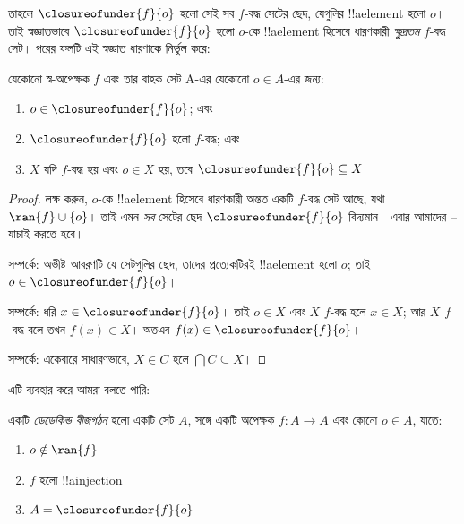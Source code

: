 \documentclass[../../../include/open-logic-section]{subfiles}
\begin{document}
তাহলে $\closureofunder{f}{o}$ হলো সেই সব $f$-বদ্ধ সেটের ছেদ, যেগুলির !!a{element} হলো $o$। তাই স্বজ্ঞাতভাবে $\closureofunder{f}{o}$ হলো $o$-কে !!a{element} হিসেবে ধারণকারী \emph{ক্ষুদ্রতম} $f$-বদ্ধ সেট। পরের ফলটি এই স্বজ্ঞাত ধারণাকে নির্ভুল করে:
\begin{lem}
	যেকোনো স্ব-অপেক্ষক $f$ এবং তার বাহক সেট A-এর যেকোনো $o \in A$-এর জন্য: 
	\begin{enumerate}
		\item{} $o \in \closureofunder{f}{o}$; এবং
		\item{} $\closureofunder{f}{o}$ হলো $f$-বদ্ধ; এবং
		\item{} $X$ যদি $f$-বদ্ধ হয় এবং $o \in
		X$ হয়, তবে $\closureofunder{f}{o} \subseteq X$
	\end{enumerate}
\end{lem}

\begin{proof}
লক্ষ করুন, $o$-কে !!a{element} হিসেবে ধারণকারী অন্তত একটি $f$-বদ্ধ সেট আছে, যথা $\ran{f}\cup
\{o\}$। তাই এমন \emph{সব} সেটের ছেদ $\closureofunder{f}{o}$ বিদ্যমান। এবার আমাদের
-- যাচাই করতে হবে।

 সম্পর্কে: অভীষ্ট আবরণটি যে সেটগুলির ছেদ, তাদের প্রত্যেকটিরই !!a{element} হলো $o$; তাই $o \in \closureofunder{f}{o}$।

 সম্পর্কে: ধরি $x \in \closureofunder{f}{o}$। তাই $o \in X$ এবং $X$ $f$-বদ্ধ হলে $x \in X$; আর $X$ $f$-বদ্ধ বলে তখন $f(x) \in X$। অতএব $f(x) \in \closureofunder{f}{o}$।

 সম্পর্কে: একেবারে সাধারণভাবে, $X
\in C$ হলে $\bigcap C \subseteq X$।
\end{proof}

এটি ব্যবহার করে আমরা বলতে পারি:

\begin{defn}
একটি \emph{ডেডেকিন্ড বীজগঠন} হলো একটি সেট $A$, সঙ্গে একটি অপেক্ষক $f
\colon A \to A$ এবং কোনো $o \in A$, যাতে:
	\begin{enumerate}
		\item {} $o \notin \ran{f}$
		\item {} $f$ হলো !!a{injection}
		\item {} $A = \closureofunder{f}{o}$
	\end{enumerate}
\end{defn}
\end{document}
